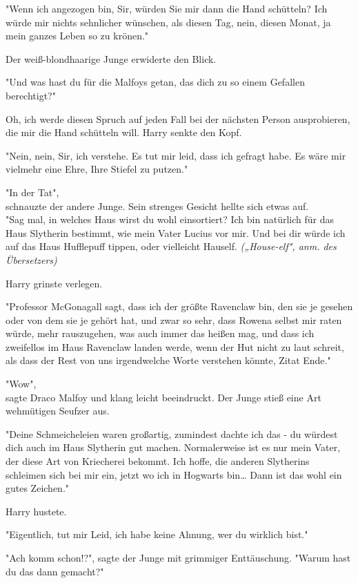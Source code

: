 {"Wenn ich angezogen bin, Sir, würden Sie mir dann die Hand schütteln? Ich würde mir nichts sehnlicher wünschen, als diesen Tag, nein, diesen Monat, ja mein ganzes Leben so zu krönen."

Der weiß-blondhaarige Junge erwiderte den Blick.

"Und was hast du für die Malfoys getan, das dich zu so einem Gefallen berechtigt?"

Oh, ich werde diesen Spruch auf jeden Fall bei der nächsten Person ausprobieren, die mir die Hand schütteln will. Harry senkte den Kopf.

"Nein, nein, Sir, ich verstehe. Es tut mir leid, dass ich gefragt habe. Es wäre mir vielmehr eine Ehre, Ihre Stiefel zu putzen."

"In der Tat",\\ schnauzte der andere Junge. Sein strenges Gesicht hellte sich etwas auf.\\ "Sag mal, in welches Haus wirst du wohl einsortiert? Ich bin natürlich für das Haus Slytherin bestimmt, wie mein Vater Lucius vor mir. Und bei dir würde ich auf das Haus Hufflepuff tippen, oder vielleicht Hauself. \emph{(„House-elf", anm. des Übersetzers)}

Harry grinste verlegen.

"Professor McGonagall sagt, dass ich der größte Ravenclaw bin, den sie je gesehen oder von dem sie je gehört hat, und zwar so sehr, dass Rowena selbst mir raten würde, mehr rauszugehen, was auch immer das heißen mag, und dass ich zweifellos im Haus Ravenclaw landen werde, wenn der Hut nicht zu laut schreit, als dass der Rest von uns irgendwelche Worte verstehen könnte, Zitat Ende."

"Wow",\\ sagte Draco Malfoy und klang leicht beeindruckt. Der Junge stieß eine Art wehmütigen Seufzer aus.

"Deine Schmeicheleien waren großartig, zumindest dachte ich das - du würdest dich auch im Haus Slytherin gut machen. Normalerweise ist es nur mein Vater, der diese Art von Kriecherei bekommt. Ich hoffe, die anderen Slytherins schleimen sich bei mir ein, jetzt wo ich in Hogwarts bin… Dann ist das wohl ein gutes Zeichen."

Harry hustete.

"Eigentlich, tut mir Leid, ich habe keine Ahnung, wer du wirklich bist."

"Ach komm schon!?", sagte der Junge mit grimmiger Enttäuschung. "Warum hast du das dann gemacht?"

}
